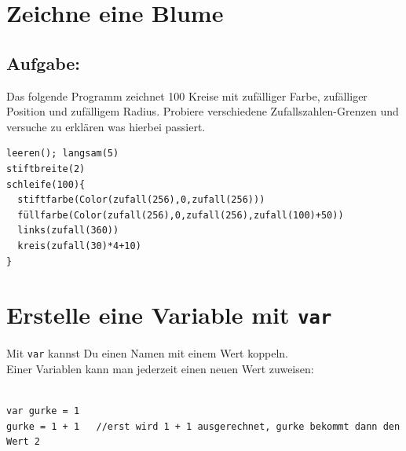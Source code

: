\chapter{Zeichne eine Blume}\section*{\color{BrickRed}Aufgabe:}
Das folgende Programm zeichnet 100 Kreise mit zufälliger Farbe, zufälliger Position und zufälligem Radius. Probiere verschiedene Zufallszahlen-Grenzen und versuche zu erklären was hierbei passiert.

  

\begin{lstlisting}[basicstyle={\ttfamily\fontsize{16}{19}\selectfont},numbers=none]
leeren(); langsam(5)
stiftbreite(2)
schleife(100){
  stiftfarbe(Color(zufall(256),0,zufall(256)))
  füllfarbe(Color(zufall(256),0,zufall(256),zufall(100)+50))
  links(zufall(360))
  kreis(zufall(30)*4+10)
}
\end{lstlisting}
        
\chapter{Erstelle eine Variable mit \lstinline{var}}Mit \lstinline{var} kannst Du einen Namen mit einem Wert koppeln.\\
Einer Variablen kann man jederzeit einen neuen Wert zuweisen:

\begin{lstlisting}[numbers=none]

var gurke = 1
gurke = 1 + 1   //erst wird 1 + 1 ausgerechnet, gurke bekommt dann den Wert 2        
        
\end{lstlisting}
        
